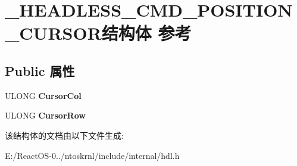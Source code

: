 \hypertarget{struct___h_e_a_d_l_e_s_s___c_m_d___p_o_s_i_t_i_o_n___c_u_r_s_o_r}{}\section{\+\_\+\+H\+E\+A\+D\+L\+E\+S\+S\+\_\+\+C\+M\+D\+\_\+\+P\+O\+S\+I\+T\+I\+O\+N\+\_\+\+C\+U\+R\+S\+O\+R结构体 参考}
\label{struct___h_e_a_d_l_e_s_s___c_m_d___p_o_s_i_t_i_o_n___c_u_r_s_o_r}
\subsection*{Public 属性}
\begin{DoxyCompactItemize}
\item 
\mbox{\label{struct___h_e_a_d_l_e_s_s___c_m_d___p_o_s_i_t_i_o_n___c_u_r_s_o_r_a0b7830e6280bb21d79a9679bfbe925ae}} 
U\+L\+O\+NG {\bfseries Cursor\+Col}
\item 
\mbox{\label{struct___h_e_a_d_l_e_s_s___c_m_d___p_o_s_i_t_i_o_n___c_u_r_s_o_r_aa392d8e5c1a8064b4da1d1d86ef2e4d8}} 
U\+L\+O\+NG {\bfseries Cursor\+Row}
\end{DoxyCompactItemize}


该结构体的文档由以下文件生成\+:\begin{DoxyCompactItemize}
\item 
E\+:/\+React\+O\+S-\/0../ntoskrnl/include/internal/hdl.\+h\end{DoxyCompactItemize}
